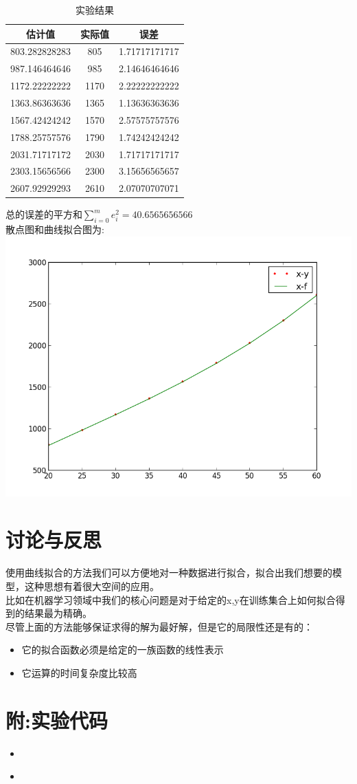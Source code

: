 \documentclass{article}
\newcommand{\pyscript}[2]{
\begin{itemize}
\item[]
\end{itemize}
}
\begin{document}
\begin{table}[!hbp]
\begin{tabular}{|c|c|c|}
\hline
估计值&实际值&误差\\
\hline
803.282828283           & 805           & 1.71717171717 \\
\hline
987.146464646           & 985           & 2.14646464646 \\
\hline
1172.22222222           & 1170          & 2.22222222222 \\
\hline
1363.86363636           & 1365          & 1.13636363636 \\
\hline
1567.42424242           & 1570          & 2.57575757576 \\
\hline
1788.25757576           & 1790          & 1.74242424242 \\
\hline
2031.71717172           & 2030          & 1.71717171717 \\
\hline
2303.15656566           & 2300          & 3.15656565657 \\
\hline
2607.92929293           & 2610          & 2.07070707071 \\
\hline
\end{tabular}
\caption{实验结果}
\end{table}
总的误差的平方和$\sum_{i=0}^{m}{e_i^2}=40.6565656566$\\
散点图和曲线拟合图为:\\
\includegraphics[width=0.75\columnwidth]{graph.png} %
\section{讨论与反思}
使用曲线拟合的方法我们可以方便地对一种数据进行拟合，拟合出我们想要的模型，这种思想有着很大空间的应用。\\
比如在机器学习领域中我们的核心问题是对于给定的x,y在训练集合上如何拟合得到的结果最为精确。\\
尽管上面的方法能够保证求得的解为最好解，但是它的局限性还是有的：\begin{itemize}
\item 它的拟合函数必须是给定的一族函数的线性表示
\item 它运算的时间复杂度比较高
\end{itemize}
\section{附:实验代码}
\pyscript{exp3}{曲线拟合代码}
\pyscript{equation}{高斯消元代码}
\end{document}
